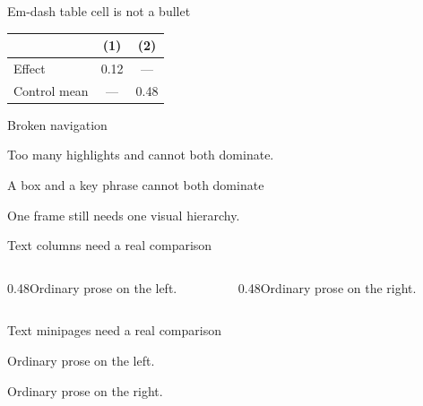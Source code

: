 \documentclass[11pt, aspectratio=169]{beamer}
\begin{document}
\begin{frame}{Em-dash table cell is not a bullet}
  \centering
  \begin{tabular}{lcc}
    \toprule
    & (1) & (2) \\
    \midrule
    Effect & 0.12 & --- \\
    Control mean & --- & 0.48 \\
    \bottomrule
  \end{tabular}
\end{frame}

\begin{frame}{Broken navigation}
  \hyperlink{app:missing}{}
\end{frame}

\begin{frame}{Too many highlights}
   and  cannot both dominate.
\end{frame}

\begin{frame}{A box and a key phrase cannot both dominate}
  \begin{ResultBox}
    One frame still needs one visual hierarchy.
  \end{ResultBox}
\end{frame}

\begin{frame}{Text columns need a real comparison}
  \begin{columns}
    \begin{column}{0.48\textwidth}Ordinary prose on the left.\end{column}
    \begin{column}{0.48\textwidth}Ordinary prose on the right.\end{column}
  \end{columns}
\end{frame}

\begin{frame}{Text minipages need a real comparison}
  \begin{minipage}{0.48\textwidth}Ordinary prose on the left.\end{minipage}\hfill
  \begin{minipage}{0.48\textwidth}Ordinary prose on the right.\end{minipage}
\end{frame}
\end{document}
